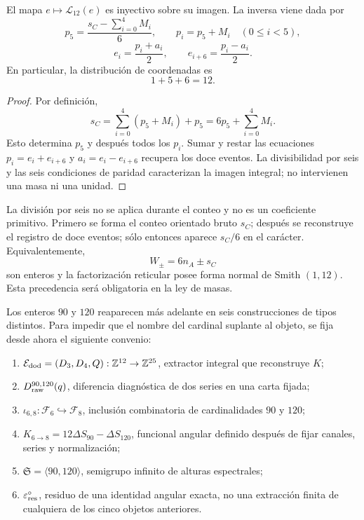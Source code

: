 \begin{theorem}
\label{thm:memoria-1-5-6}
El mapa \(e\mapsto\mathscr L_{12}(e)\) es inyectivo sobre su imagen. La
inversa viene dada por
\[
 p_5=\frac{s_C-\sum_{i=0}^{4}M_i}{6},\qquad
 p_i=p_5+M_i\quad(0\le i<5),
\]
\[
 e_i=\frac{p_i+a_i}{2},\qquad
 e_{i+6}=\frac{p_i-a_i}{2}.
\]
En particular, la distribución de coordenadas es
\[
 \boxed{1+5+6=12}.
\]
\end{theorem}

\begin{proof}
Por definición,
\[
 s_C=\sum_{i=0}^{4}(p_5+M_i)+p_5
 =6p_5+\sum_{i=0}^{4}M_i.
\]
Esto determina \(p_5\) y después todos los \(p_i\). Sumar y restar las
ecuaciones \(p_i=e_i+e_{i+6}\) y \(a_i=e_i-e_{i+6}\) recupera los doce
eventos. La divisibilidad por seis y las seis condiciones de paridad
caracterizan la imagen integral; no intervienen una masa ni una unidad.
\end{proof}

La división por seis no se aplica durante el conteo y no es un coeficiente
primitivo. Primero se forma el conteo orientado bruto \(s_C\); después se
reconstruye el registro de doce eventos; sólo entonces aparece
\(s_C/6\) en el carácter. Equivalentemente,
\[
 W_\pm=6n_A\pm s_C
\]
son enteros y la factorización reticular posee forma normal de Smith
\((1,12)\). Esta precedencia será obligatoria en la ley de masas.

Los enteros \(90\) y \(120\) reaparecen más adelante en seis construcciones
de tipos distintos. Para impedir que el nombre del cardinal suplante al
objeto, se fija desde ahora el siguiente convenio:

\begin{enumerate}
 \item \(\mathcal E_{\rm dod}=(D_3,D_4,Q):\mathbb Z^{12}\to\mathbb Z^{25}\),
       extractor integral que reconstruye \(K\);
 \item \(D_{\rm raw}^{90,120}(q)\), diferencia diagnóstica de dos series en
       una carta fijada;
 \item \(\iota_{6,8}:\mathcal F_6\hookrightarrow\mathcal F_8\), inclusión
       combinatoria de cardinalidades \(90\) y \(120\);
 \item \(K_{6\to8}=12\Delta S_{90}-\Delta S_{120}\), funcional angular
       definido después de fijar canales, series y normalización;
 \item \(\mathfrak S=\langle90,120\rangle\), semigrupo infinito de alturas
       espectrales;
 \item \(\varepsilon_{\rm res}^{\circ}\), residuo de una identidad angular
       exacta, no una extracción finita de cualquiera de los cinco objetos
       anteriores.
\end{enumerate}

